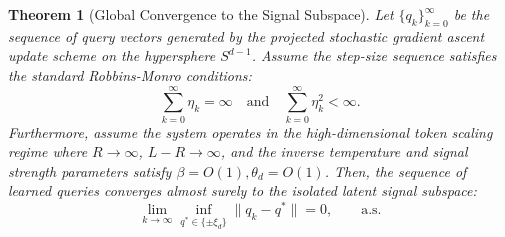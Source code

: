 \documentclass[10pt,a4paper]{amsart}
\newtheorem{theorem}{Theorem}
\begin{document}
\begin{theorem}[Global Convergence to the Signal Subspace] \label{thm:main}
Let $\{q_k\}_{k=0}^{\infty}$ be the sequence of query vectors generated by the projected stochastic gradient ascent update scheme on the hypersphere $S^{d-1}$. Assume the step-size sequence satisfies the standard Robbins-Monro conditions:
\begin{equation}
    \sum_{k=0}^{\infty} \eta_k = \infty \quad \text{and} \quad \sum_{k=0}^{\infty} \eta_k^2 < \infty.
\end{equation}
Furthermore, assume the system operates in the high-dimensional token scaling regime where $R \to \infty$, $L-R \to \infty$, and the inverse temperature and signal strength parameters satisfy $\beta =O(1), \theta_d = O(1)$. Then, the sequence of learned queries converges almost surely to the isolated latent signal subspace:
\begin{equation}
    \lim_{k \to \infty} \inf_{q^* \in \{\pm \xi_d\}} \|q_k - q^*\| = 0, \qquad \text{a.s.}
\end{equation}
\end{theorem}
\end{document}
